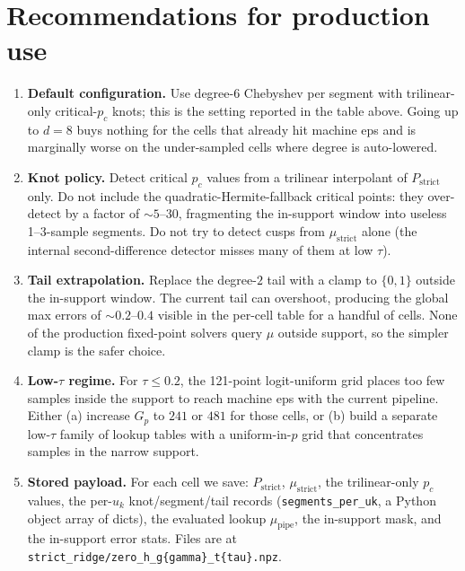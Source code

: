 \documentclass[11pt]{article}
\begin{document}
\section{Recommendations for production use}
\begin{enumerate}
  \item \textbf{Default configuration.} Use degree-$6$ Chebyshev per      segment with trilinear-only critical-$p_c$ knots; this is the      setting reported in the table above.  Going up to $d{=}8$ buys      nothing for the cells that already hit machine eps and is      marginally worse on the under-sampled cells where degree is      auto-lowered.
  \item \textbf{Knot policy.}  Detect critical $p_c$ values from a      trilinear interpolant of $P_{\mathrm{strict}}$ only.  Do not include      the quadratic-Hermite-fallback critical points: they over-detect by      a factor of $\sim 5$--$30$, fragmenting the in-support window into      useless 1--3-sample segments.  Do not try to detect cusps from      $\mu_{\mathrm{strict}}$ alone (the internal second-difference      detector misses many of them at low $\tau$).
  \item \textbf{Tail extrapolation.}  Replace the degree-$2$ tail with      a clamp to $\{0, 1\}$ outside the in-support window.  The current      tail can overshoot, producing the global max errors of      $\sim 0.2$--$0.4$ visible in the per-cell table for a handful of      cells.  None of the production fixed-point solvers query $\mu$      outside support, so the simpler clamp is the safer choice.
  \item \textbf{Low-$\tau$ regime.}  For $\tau \leq 0.2$, the 121-point      logit-uniform grid places too few samples inside the support to      reach machine eps with the current pipeline.  Either (a) increase      $G_p$ to $241$ or $481$ for those cells, or (b) build a separate      low-$\tau$ family of lookup tables with a uniform-in-$p$ grid that      concentrates samples in the narrow support.
  \item \textbf{Stored payload.}  For each cell we save:      $P_{\mathrm{strict}}$, $\mu_{\mathrm{strict}}$, the trilinear-only      $p_c$ values, the per-$u_k$ knot/segment/tail records      (\texttt{segments\_per\_uk}, a Python object array of dicts), the      evaluated lookup $\mu_{\mathrm{pipe}}$, the in-support mask, and      the in-support error stats.  Files are at      \texttt{strict\_ridge/zero\_h\_g\{gamma\}\_t\{tau\}.npz}.
\end{enumerate}
\end{document}
